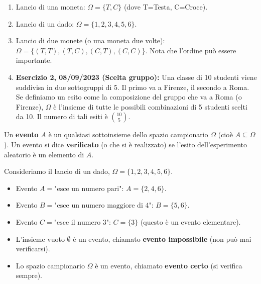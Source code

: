 \begin{example}
\begin{enumerate}
    \item Lancio di una moneta: $\Omega = \{T, C\}$ (dove T=Testa, C=Croce).
    \item Lancio di un dado: $\Omega = \{1, 2, 3, 4, 5, 6\}$.
    \item Lancio di due monete (o una moneta due volte): $\Omega = \{(T,T), (T,C), (C,T), (C,C)\}$. Nota che l'ordine può essere importante.
    \item \textbf{Esercizio 2, 08/09/2023 (Scelta gruppo):} Una classe di 10 studenti viene suddivisa in due sottogruppi di 5. Il primo va a Firenze, il secondo a Roma. Se definiamo un esito come la composizione del gruppo che va a Roma (o Firenze), $\Omega$ è l'insieme di tutte le possibili combinazioni di 5 studenti scelti da 10. Il numero di tali esiti è $\binom{10}{5}$.
\end{enumerate}
\end{example}

\begin{definition}[Evento]
Un \textbf{evento} $A$ è un qualsiasi sottoinsieme dello spazio campionario $\Omega$ (cioè $A \subseteq \Omega$). Un evento si dice \textbf{verificato} (o che si è realizzato) se l'esito dell'esperimento aleatorio è un elemento di $A$.
\end{definition}

\begin{example}
Consideriamo il lancio di un dado, $\Omega = \{1, 2, 3, 4, 5, 6\}$.
\begin{itemize}
    \item Evento $A = \text{"esce un numero pari"}$: $A = \{2, 4, 6\}$.
    \item Evento $B = \text{"esce un numero maggiore di 4"}$: $B = \{5, 6\}$.
    \item Evento $C = \text{"esce il numero 3"}$: $C = \{3\}$ (questo è un evento elementare).
    \item L'insieme vuoto $\emptyset$ è un evento, chiamato \textbf{evento impossibile} (non può mai verificarsi).
    \item Lo spazio campionario $\Omega$ è un evento, chiamato \textbf{evento certo} (si verifica sempre).
\end{itemize}
\end{example}

